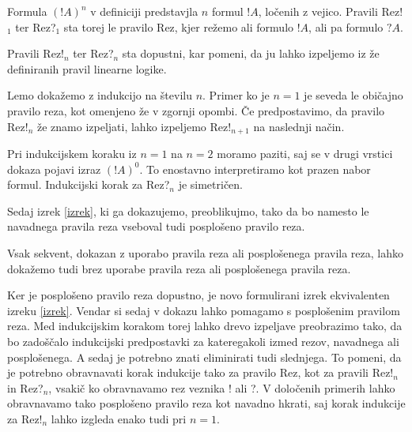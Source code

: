 \begin{opomba}
    Formula $(!A)^n$ v definiciji predstavjla $n$ formul $!A$, ločenih z vejico. Pravili Rez!$_{1}$ ter Rez?$_{1}$ sta torej le pravilo Rez, kjer režemo ali formulo $!A$, ali pa formulo $?A$.
\end{opomba}

\begin{lema}
    Pravili Rez!$_n$ ter Rez?$_{n}$ sta dopustni, kar pomeni, da ju lahko izpeljemo iz že definiranih pravil linearne logike.
\end{lema}

\begin{dokaz}
    Lemo dokažemo z indukcijo na številu $n$. Primer ko je $n=1$ je seveda le običajno pravilo reza, kot omenjeno že v zgornji opombi. Če predpostavimo, da pravilo Rez!$_n$ že znamo izpeljati, lahko izpeljemo Rez!$_{n+1}$ na naslednji način.
    \begin{prooftree}

    \end{prooftree}
    Pri indukcijskem koraku iz $n=1$ na $n=2$ moramo paziti, saj se v drugi vrstici dokaza pojavi izraz $(!A)^0$. To enostavno interpretiramo kot prazen nabor formul. Indukcijski korak za Rez?$_{n}$ je simetričen.
\end{dokaz}

Sedaj izrek \ref{izrek}, ki ga dokazujemo, preoblikujmo, tako da bo namesto le navadnega pravila reza vseboval tudi  posplošeno pravilo reza.
\begin{izrek}
    Vsak sekvent, dokazan z uporabo pravila reza ali posplošenega pravila reza, lahko dokažemo tudi brez uporabe pravila reza ali posplošenega pravila reza.
\end{izrek}

Ker je posplošeno pravilo reza dopustno, je novo formulirani izrek ekvivalenten izreku \ref{izrek}. Vendar si sedaj v dokazu lahko pomagamo s posplošenim pravilom reza. Med indukcijskim korakom torej lahko drevo izpeljave preobrazimo tako, da bo zadoščalo indukcijski predpostavki za kateregakoli izmed rezov, navadnega ali posplošenega. A sedaj je potrebno znati eliminirati tudi slednjega. To pomeni, da je potrebno obravnavati korak indukcije tako za pravilo Rez, kot za pravili Rez!$_n$ in Rez?$_n$, vsakič ko obravnavamo rez veznika ! ali ?. V določenih primerih lahko obravnavamo tako posplošeno pravilo reza kot navadno hkrati, saj korak indukcije za Rez!$_n$ lahko izgleda enako tudi pri $n=1$.

